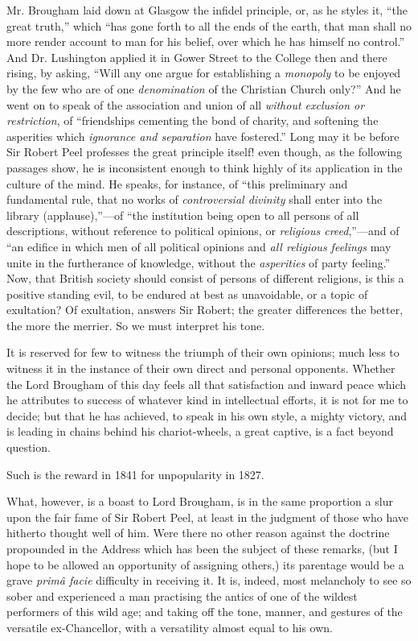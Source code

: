 Mr. Brougham laid down at Glasgow the infidel principle, or, as he
styles it, ``the great truth,'' which ``has gone forth to
all the ends of the earth, that man shall no more render account to
man for his belief, over which he has himself no control.'' And
Dr. Lushington applied it in Gower Street to the College then and
there rising, by asking, ``Will any one argue for establishing a \emph{monopoly}
to be enjoyed by the few who are of one \emph{denomination} of the
Christian Church only?'' And he went on to speak of the
association and union of all \emph{without exclusion or restriction},
of ``friendships cementing the bond of charity, and softening the
asperities which \emph{ignorance and separation} have fostered.''
Long may it be before Sir Robert Peel professes the great principle
itself! even though, as the following passages show, he is
inconsistent enough to think highly of its application in the culture
of the mind. He speaks, for instance, of ``this preliminary and
fundamental rule, that no works of \emph{controversial divinity} shall
enter into the library (applause),''—of ``the institution
being open to all persons of all descriptions, without reference to
political opinions, or \emph{religious creed},''—and of ``an
edifice in which men of all political opinions and \emph{all religious
feelings} may unite in the furtherance of knowledge, without the \emph{asperities}
of party feeling.'' Now, that British society should consist of
persons of different religions, is this a positive standing evil, to
be endured at best as unavoidable, or a topic of exultation? Of
exultation, answers Sir Robert; the greater differences the better,
the more the merrier. So we must interpret his tone.

It is reserved for few to witness the triumph of their own
opinions; much less to witness it in the instance of their own direct
and personal opponents. Whether the Lord Brougham of this day feels
all that satisfaction and inward peace which he attributes to success
of whatever kind in intellectual efforts, it is not for me to decide;
but that he has achieved, to speak in his own style, a mighty victory,
and is leading in chains behind his chariot-wheels, a great captive,
is a fact beyond question.

Such is the reward in 1841 for unpopularity in 1827.

What, however, is a boast to Lord Brougham, is in the same
proportion a slur upon the fair fame of Sir Robert Peel, at least in
the judgment of those who have hitherto thought well of him. Were
there no other reason against the doctrine propounded in the Address
which has been the subject of these remarks, (but I hope to be allowed
an opportunity of assigning others,) its parentage would be a grave \emph{primâ
facie} difficulty in receiving it. It is, indeed, most melancholy
to see so sober and experienced a man practising the antics of one of
the wildest performers of this wild age; and taking off the tone,
manner, and gestures of the versatile ex-Chancellor, with a
versatility almost equal to his own.

